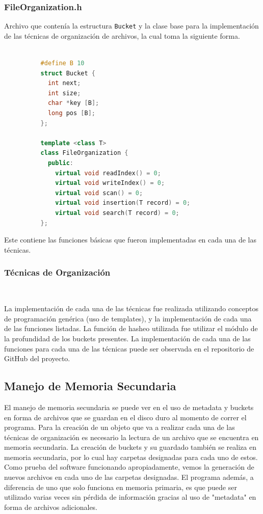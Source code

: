\documentclass{article}
\begin{document}
      \subsubsection{FileOrganization.h}
      
        Archivo que contenía la estructura \texttt{Bucket} y la clase base para la implementación de las técnicas de organización de archivos, la cual toma la siguiente forma. 

        \begin{lstlisting}[language=C++]
        
          #define B 10
          struct Bucket {
            int next;
            int size;
            char *key [B];
            long pos [B];
          };

          template <class T>
          class FileOrganization {
            public:
              virtual void readIndex() = 0;
              virtual void writeIndex() = 0;
              virtual void scan() = 0;
              virtual void insertion(T record) = 0;
              virtual void search(T record) = 0;
          };

        \end{lstlisting}
        
        Este contiene las funciones básicas que fueron implementadas en cada una de las técnicas. 

      \subsubsection{Técnicas de Organización} 
        
        La implementación de cada una de las técnicas fue realizada utilizando conceptos de programación genérica (uso de templates), y la implementación de cada una de las funciones listadas. La función de hasheo utilizada fue utilizar el módulo de la profundidad de los buckets presentes. La implementación de cada una de las funciones para cada una de las técnicas puede ser observada en el repositorio de GitHub del proyecto.

    \subsection{Manejo de Memoria Secundaria}

      El manejo de memoria secundaria se puede ver en el uso de metadata y buckets en forma de archivos que se guardan en el disco duro al momento de correr el programa. Para la creación de un objeto que va a realizar cada una de las técnicas de organización es necesario la lectura de un archivo que se encuentra en memoria secundaria. La creación de buckets y su guardado también se realiza en memoria secundaria, por lo cual hay carpetas designadas para cada uno de estos. Como prueba del software funcionando apropiadamente, vemos la generación de nuevos archivos en cada uno de las carpetas designadas. El programa además, a diferencia de uno que solo funciona en memoria primaria, es que puede ser utilizado varias veces sin pérdida de información gracias al uso de "metadata" en forma de archivos adicionales.
\end{document}
